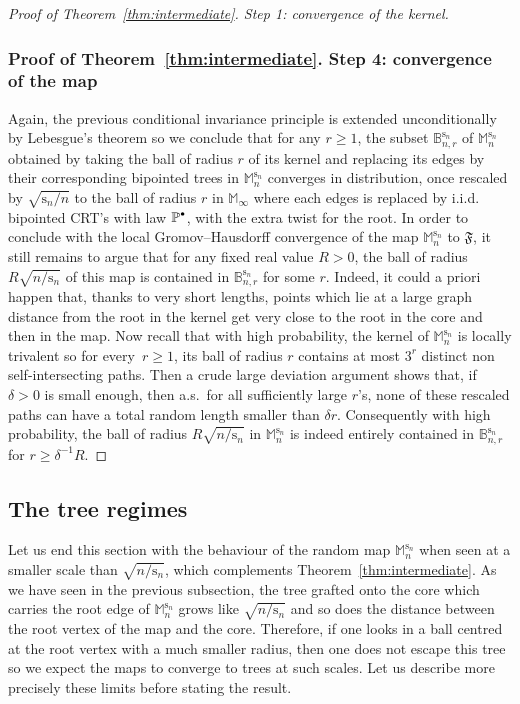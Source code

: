 \documentclass[11pt]{article}
\newcommand{\sbullet}{{\raisebox{1pt}{$\scriptscriptstyle\bullet $}}}
\theoremstyle{plain}
\theoremstyle{definition}
\theoremstyle{remark}
\renewcommand{\P}{\mathbb{P}}
\newcommand{\Mapb}{\mathbb{M}}
\newcommand{\spar}{\mathrm{s}}
\begin{document}
\begin{proof}[Proof of Theorem~\ref{thm:intermediate}. Step 1: convergence of the kernel]
\subsubsection*{Proof of Theorem~\ref{thm:intermediate}. Step 4: convergence of the map}\enlargethispage{.5\baselineskip}%
Again, the previous conditional invariance principle is extended unconditionally by Lebesgue's theorem so we conclude that for any $r\ge 1$, the subset $\mathbb{B}_{n,r}^{\spar_n}$ of $\Mapb_n^{\spar_n}$ obtained by taking the ball of radius $r$ of its kernel and replacing its edges by their corresponding bipointed trees in $\Mapb_n^{\spar_n}$ converges in distribution, once rescaled by $\sqrt{\spar_n/n}$ to the ball of radius $r$ in $\Mapb_\infty$ where each edges is replaced by i.i.d. bipointed CRT's with law $\P^{\sbullet}$, with the extra twist for the root.
In order to conclude with the local Gromov--Hausdorff convergence of the map $\Mapb_n^{\spar_n}$ to $\mathfrak{F}$, it still remains to argue that for any fixed real value $R>0$, the ball of radius $R \sqrt{n/\spar_n}$ of this map is contained in $\mathbb{B}_{n,r}^{\spar_n}$ for some $r$. Indeed, it could a priori happen that, thanks to very short lengths, points which lie at a large graph distance from the root in the kernel get very close to the root in the core and then in the map.
Now recall that with high probability, the kernel of $\Mapb_n^{\spar_n}$ is locally trivalent so for every~$r \ge 1$, its ball of radius $r$ contains at most $3^{r}$ distinct non self-intersecting paths. Then a crude large deviation argument shows that, if $\delta>0$ is small enough, then a.s.~for all sufficiently large $r$'s, none of these rescaled paths can have a total random length smaller than $\delta r$. Consequently with high probability, the ball of radius $R \sqrt{n/\spar_n}$ in $\Mapb_n^{\spar_n}$ is indeed entirely contained in $\mathbb{B}_{n,r}^{\spar_n}$ for $r \ge \delta^{-1} R$.
\end{proof}

\subsection{The tree regimes}
\label{ssec:limites_abres}

Let us end this section with the behaviour of the random map $\Mapb_n^{\spar_n}$ when seen at a smaller scale than $\sqrt{n/\spar_n}$, which complements Theorem~\ref{thm:intermediate}. As we have seen in the previous subsection, the tree grafted onto the core which carries the root edge of $\Mapb_n^{\spar_n}$ grows like $\sqrt{n/\spar_n}$ and so does the distance between the root vertex of the map and the core. Therefore, if one looks in a ball centred at the root vertex with a much smaller radius, then one does not escape this tree so we expect the maps to converge to trees at such scales. Let us describe more precisely these limits before stating the result.
\end{document}
